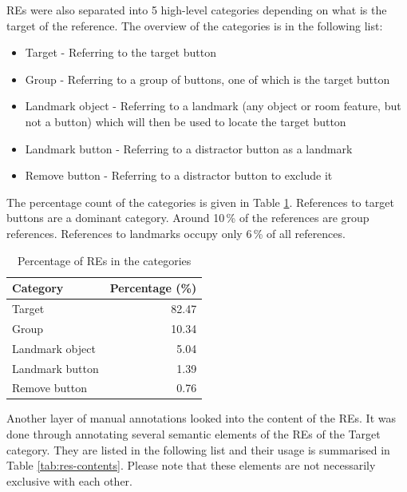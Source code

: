 REs were also separated into 5 high-level categories depending on what is the target of the reference. The  overview of the categories is in the following list:

\begin{itemize}
\item
Target - Referring to the target button
\item
Group - Referring to a group of buttons, one of which is the target button
\item
Landmark object - Referring to a landmark (any object or room feature, but not a button) which will then be used to locate the target button
\item
Landmark button - Referring to a distractor button as a landmark
\item
Remove button -  Referring to a distractor button to exclude it
\end{itemize}

The percentage count of the categories is given in Table \ref{tab:res-groups}. References to target buttons are a dominant category. Around 10\,\% of the references are group references. References to landmarks occupy only 6\,\% of all references.

\begin{table}[!htbp]
 \centering
\begin{tabular}{lr}
\toprule
Category  & Percentage (\%)  \\
\midrule
Target   		& 82.47\\
Group 			& 10.34\\
Landmark object 	& 5.04\\
Landmark button	& 1.39\\
Remove button 	& 0.76\\
\bottomrule
\end{tabular}
\caption{Percentage of REs in the categories}
\label{tab:res-groups}
\end{table} 

Another layer of manual annotations looked into the content of the REs. It was done through annotating several semantic elements of the REs of the Target category. They are listed in the following list and their usage is summarised in Table \ref{tab:res-contents}. Please note that these elements are not necessarily exclusive with each other.

